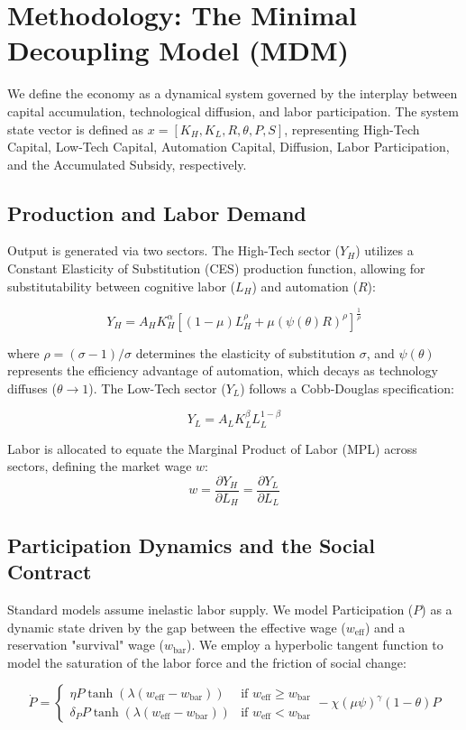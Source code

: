 \section{Methodology: The Minimal Decoupling Model (MDM)}

We define the economy as a dynamical system governed by the interplay between capital accumulation, technological diffusion, and labor participation. The system state vector is defined as $x = [K_H, K_L, R, \theta, P, S]$, representing High-Tech Capital, Low-Tech Capital, Automation Capital, Diffusion, Labor Participation, and the Accumulated Subsidy, respectively.

\subsection{Production and Labor Demand}
Output is generated via two sectors. The High-Tech sector ($Y_H$) utilizes a Constant Elasticity of Substitution (CES) production function, allowing for substitutability between cognitive labor ($L_H$) and automation ($R$):

$$
Y_H = A_H K_H^\alpha \left[ (1-\mu)L_H^\rho + \mu (\psi(\theta) R)^\rho \right]^{\frac{1}{\rho}}
$$

where $\rho = (\sigma-1)/\sigma$ determines the elasticity of substitution $\sigma$, and $\psi(\theta)$ represents the efficiency advantage of automation, which decays as technology diffuses ($\theta \to 1$). The Low-Tech sector ($Y_L$) follows a Cobb-Douglas specification:

$$
Y_L = A_L K_L^\beta L_L^{1-\beta}
$$

Labor is allocated to equate the Marginal Product of Labor (MPL) across sectors, defining the market wage $w$:
$$
w = \frac{\partial Y_H}{\partial L_H} = \frac{\partial Y_L}{\partial L_L}
$$

\subsection{Participation Dynamics and the Social Contract}
Standard models assume inelastic labor supply. We model Participation ($P$) as a dynamic state driven by the gap between the effective wage ($w_{\text{eff}}$) and a reservation "survival" wage ($w_{\text{bar}}$). We employ a hyperbolic tangent function to model the saturation of the labor force and the friction of social change:

$$
\dot{P} = 
\begin{cases} 
\eta P \tanh(\lambda (w_{\text{eff}} - w_{\text{bar}})) & \text{if } w_{\text{eff}} \geq w_{\text{bar}} \\
\delta_P P \tanh(\lambda (w_{\text{eff}} - w_{\text{bar}})) & \text{if } w_{\text{eff}} < w_{\text{bar}}
\end{cases}
 - \chi (\mu \psi)^\gamma (1-\theta) P
$$

